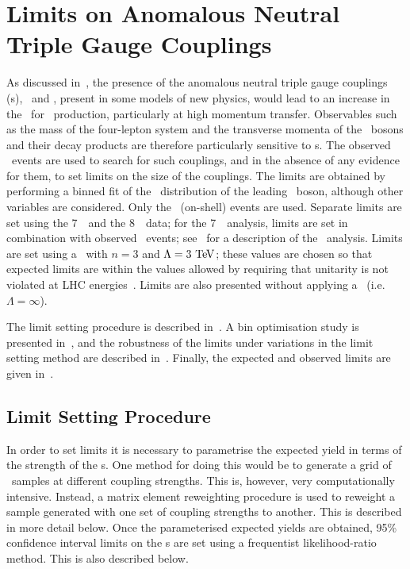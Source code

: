 \graphicspath{{Chapters/TGCLimits/Figures/}}
\chapter{Limits on Anomalous Neutral Triple Gauge Couplings}
\label{chap:TGCLimits}

As discussed in~, the presence of the anomalous neutral
triple gauge couplings (\TGC s), \ZZZ\ and \ZZg, present in some models of new
physics, would lead to an increase in the
\cx\ for \ZZ\ production, particularly at high momentum transfer. Observables
such as the mass of the four-lepton system and the transverse momenta of the \Z\
bosons and their decay products are therefore particularly sensitive to \TGC s.
The observed \ZZllll\ events are used to search for
such couplings, and in the absence of any evidence for them, to set limits on
the size of the couplings. The limits are obtained by performing a binned fit of
the \pt\ distribution of the leading \Z\ boson, although other variables are considered. Only
the \ZZ\ (on-shell) events are used. Separate limits are set using the 7~\tev\
and the 8~\tev\ data; for the 7~\tev\ analysis, limits are set in combination
with observed \ZZllvv\ events; see~\cite{ATLAS:2012kg} for a description of the
\ZZllvv\ analysis. Limits are set using a \formfactor\ with $n = 3$ and $\Lambda
= 3 \TeV$; these values are chosen so that expected limits
are within the values allowed by requiring that unitarity is not violated at LHC energies~\cite{Baur:2000ae}.
Limits are also presented without applying a \formfactor\ (i.e.
$\Lambda=\infty$).

The limit setting procedure is described in~. A bin
optimisation study is presented in~, and the robustness of the
limits under variations in the limit setting method are described
in~\sec{TGC-Robustness}. Finally, the expected and observed limits are given
in~\sec{TGC-ExpObsLimits}.

\section{Limit Setting Procedure}
\label{sec:TGC-methodology}

In order to set limits it is necessary to parametrise the expected yield in
terms of the strength of the \TGC s. One method for doing this would be
to generate a grid of \mc\ samples at different coupling strengths. This is,
however, very computationally intensive. Instead, a matrix element reweighting procedure
is used to reweight a sample generated with one set of coupling strengths to another.
This is described in more detail below. Once the parameterised expected yields
are obtained, 95\% confidence interval limits on the \TGC s are set using a
frequentist likelihood-ratio method. This is also described below.

